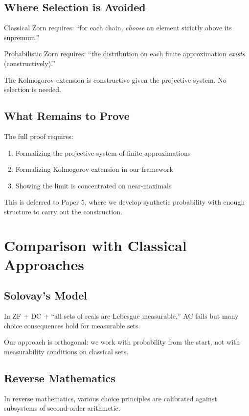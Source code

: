 \documentclass[11pt,a4paper]{article}
\begin{document}
\subsection{Where Selection is Avoided}

Classical Zorn requires: ``for each chain, \emph{choose} an element strictly above its supremum.''

Probabilistic Zorn requires: ``the distribution on each finite approximation \emph{exists} (constructively).''

The Kolmogorov extension is constructive given the projective system. No selection is needed.

\subsection{What Remains to Prove}

The full proof requires:
\begin{enumerate}
    \item Formalizing the projective system of finite approximations
    \item Formalizing Kolmogorov extension in our framework
    \item Showing the limit is concentrated on near-maximals
\end{enumerate}

This is deferred to Paper 5, where we develop synthetic probability with enough structure to carry out the construction.

\section{Comparison with Classical Approaches}

\subsection{Solovay's Model}

In ZF + DC + ``all sets of reals are Lebesgue measurable,'' AC fails but many choice consequences hold for measurable sets.

Our approach is orthogonal: we work with probability from the start, not with measurability conditions on classical sets.

\subsection{Reverse Mathematics}

In reverse mathematics, various choice principles are calibrated against subsystems of second-order arithmetic.
\end{document}

